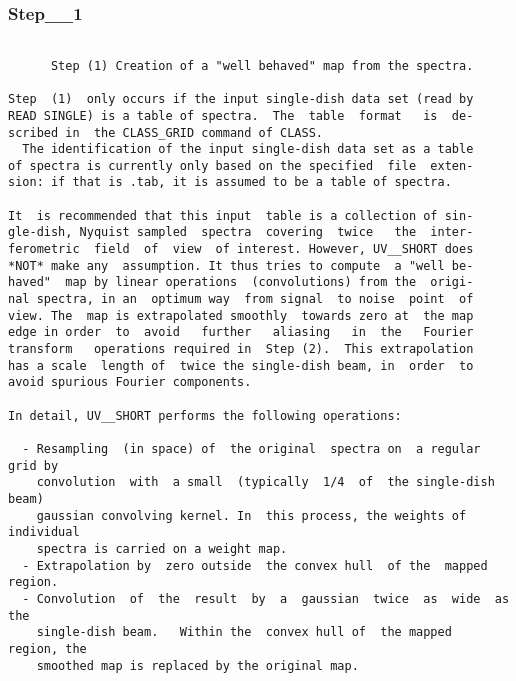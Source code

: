 \subsubsection{Step\_\_1}
\begin{verbatim}

      Step (1) Creation of a "well behaved" map from the spectra.

Step  (1)  only occurs if the input single-dish data set (read by
READ SINGLE) is a table of spectra.  The  table  format   is  de-
scribed in  the CLASS_GRID command of CLASS.
  The identification of the input single-dish data set as a table
of spectra is currently only based on the specified  file  exten-
sion: if that is .tab, it is assumed to be a table of spectra.

It  is recommended that this input  table is a collection of sin-
gle-dish, Nyquist sampled  spectra  covering  twice   the  inter-
ferometric  field  of  view  of interest. However, UV__SHORT does
*NOT* make any  assumption. It thus tries to compute  a "well be-
haved"  map by linear operations  (convolutions) from the  origi-
nal spectra, in an  optimum way  from signal  to noise  point  of
view. The  map is extrapolated smoothly  towards zero at  the map
edge in order  to  avoid   further   aliasing   in  the   Fourier
transform   operations required in  Step (2).  This extrapolation
has a scale  length of  twice the single-dish beam, in  order  to
avoid spurious Fourier components.

In detail, UV__SHORT performs the following operations:

  - Resampling  (in space) of  the original  spectra on  a regular  grid by
    convolution  with  a small  (typically  1/4  of  the single-dish  beam)
    gaussian convolving kernel. In  this process, the weights of individual
    spectra is carried on a weight map.
  - Extrapolation by  zero outside  the convex hull  of the  mapped region.
  - Convolution  of  the  result  by  a  gaussian  twice  as  wide  as  the
    single-dish beam.   Within the  convex hull of  the mapped  region, the
    smoothed map is replaced by the original map.

\end{verbatim}
